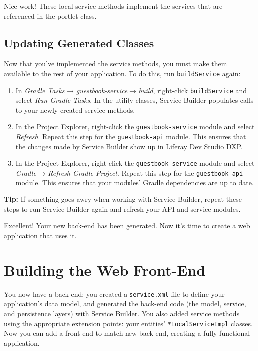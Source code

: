 Nice work! These local service methods implement the services that are
referenced in the portlet class.

\section{Updating Generated Classes}\label{updating-generated-classes}

Now that you've implemented the service methods, you must make them
available to the rest of your application. To do this, run
\texttt{buildService} again:

\begin{enumerate}
\def\labelenumi{\arabic{enumi}.}
\item
  In \emph{Gradle Tasks} → \emph{guestbook-service} → \emph{build},
  right-click \texttt{buildService} and select \emph{Run Gradle Tasks}.
  In the utility classes, Service Builder populates calls to your newly
  created service methods.
\item
  In the Project Explorer, right-click the \texttt{guestbook-service}
  module and select \emph{Refresh}. Repeat this step for the
  \texttt{guestbook-api} module. This ensures that the changes made by
  Service Builder show up in Liferay Dev Studio DXP.
\item
  In the Project Explorer, right-click the \texttt{guestbook-service}
  module and select \emph{Gradle} → \emph{Refresh Gradle Project}.
  Repeat this step for the \texttt{guestbook-api} module. This ensures
  that your modules' Gradle dependencies are up to date.
\end{enumerate}

\noindent\hrulefill

\textbf{Tip:} If something goes awry when working with Service Builder,
repeat these steps to run Service Builder again and refresh your API and
service modules.

\noindent\hrulefill

Excellent! Your new back-end has been generated. Now it's time to create
a web application that uses it.

\chapter{Building the Web Front-End}\label{building-the-web-front-end}

You now have a back-end: you created a \texttt{service.xml} file to
define your application's data model, and generated the back-end code
(the model, service, and persistence layers) with Service Builder. You
also added service methods using the appropriate extension points: your
entities' \texttt{*LocalServiceImpl} classes. Now you can add a
front-end to match new back-end, creating a fully functional
application.


